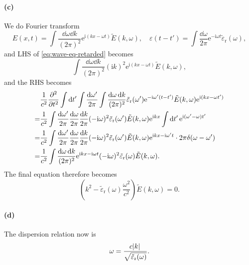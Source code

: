 \documentclass[hyperref, a4paper]{article}
\newcommand*{\ii}{\mathrm{i}}
\newcommand*{\ee}{\mathrm{e}}
\begin{document}
\paragraph{(c)} We do Fourier transform 
\begin{equation}
    E(x, t) = \int \frac{\dd{\omega} \dd{k}}{(2\pi)^2}
    \ee^{\ii (kx - \omega t)} \tilde{E}(k, \omega), \quad 
    \varepsilon(t - t') = \int \frac{\dd{\omega}}{2\pi} \ee^{- \ii \omega t} 
    \tilde{\varepsilon}_{\text{r}}(\omega),
\end{equation}
and LHS of \eqref{eq:wave-eq-retarded} becomes 
\begin{equation}
    \int \frac{\dd{\omega} \dd{k}}{(2\pi)^2} (\ii k)^2
    \ee^{\ii (kx - \omega t)} \tilde{E}(k, \omega),
\end{equation}
and the RHS becomes 
\begin{equation}
    \begin{aligned}
        &\frac{1}{c^2} \pdv[2]{t} \int \dd{t'} 
        \int \frac{\dd{\omega'}}{2\pi} \int \frac{\dd{\omega} \dd{k}}{(2\pi)^2} 
        \tilde{\varepsilon}_{\text{r}}(\omega') \ee^{-\ii \omega' (t - t')} 
        \tilde{E}(k, \omega) \ee^{\ii (kx - \omega t')} \\
        =& \frac{1}{c^2} \int \frac{\dd{\omega'}}{2\pi} \frac{\dd{\omega}}{2\pi} \frac{\dd{k}}{2\pi}
        (- \ii \omega)^2 \tilde{\varepsilon}_{\text{r}}(\omega') \tilde{E}(k, \omega) 
        \ee^{\ii k x} \int \dd{t'} \ee^{\ii (\omega' - \omega) t'} \\
        =&  \frac{1}{c^2} \int \frac{\dd{\omega'}}{2\pi} \frac{\dd{\omega}}{2\pi} \frac{\dd{k}}{2\pi}
        (- \ii \omega)^2 \tilde{\varepsilon}_{\text{r}}(\omega') \tilde{E}(k, \omega) 
        \ee^{\ii k x - \ii \omega' t} \cdot 2\pi \delta(\omega - \omega') \\
        =& \frac{1}{c^2} \int \frac{\dd{\omega} \dd{k}}{(2\pi)^2}
        \ee^{\ii k x - \ii \omega t} (- \ii \omega)^2 \tilde{\varepsilon}_{\text{r}}(\omega) \tilde{E}(k, \omega) .
    \end{aligned}
\end{equation}
The final equation therefore becomes 
\begin{equation}
    \left(
        k^2 - \tilde{\varepsilon}_{\text{r}}(\omega) \frac{\omega^2}{c^2}
    \right) \tilde{E}(k, \omega) = 0.
\end{equation}

\paragraph{(d)} The dispersion relation now is
\begin{equation}
    \omega = \frac{c \abs*{k}}{\sqrt{\tilde{\varepsilon}_{\text{r}}(\omega)}} .
\end{equation}
\end{document}
